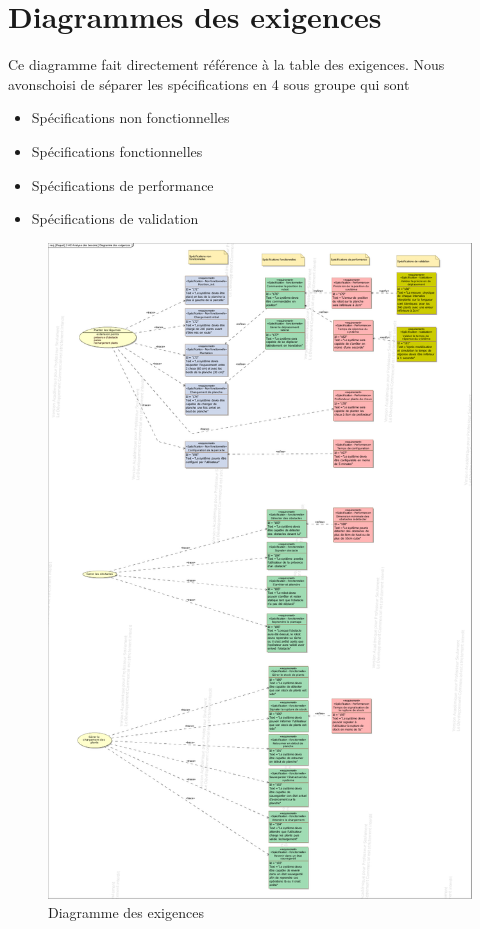 \section{Diagrammes des exigences}
Ce diagramme fait directement référence à la table des exigences. Nous avonschoisi de séparer les spécifications en 4 sous groupe qui sont
\begin{itemize}
\item [\textbullet] Spécifications non fonctionnelles 
\item [\textbullet]Spécifications fonctionnelles
\item [\textbullet] Spécifications de performance
\item [\textbullet] Spécifications de validation
\end{itemize}
\begin{figure}[!ht]
\centering
\includegraphics[width = .8\textwidth]{./II/images/SysML_Requirements_Diagram__2-AE_Analyse_des_besoins__Diagramme_des_exigences.pdf}
\caption{Diagramme des exigences}\label{fig:requirementsDiagram}
\end{figure}
\newpage

